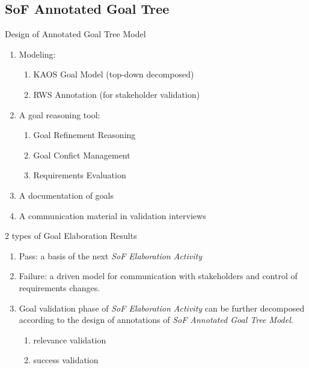 \documentclass{beamer}
\begin{document}
\subsection{SoF Annotated Goal Tree}
\begin{frame}{Design of Annotated Goal Tree Model}
  \begin{enumerate}
  \item Modeling:
    \begin{enumerate}
    \item KAOS Goal Model  (top-down decomposed)
    \item RWS Annotation  (for stakeholder validation)
    \end{enumerate}
  \item A goal reasoning tool: 
    \begin{enumerate}
    \item Goal Refinement Reasoning
    \item Goal Confict Management
    \item Requirements Evaluation
    \end{enumerate}
  \item A documentation of goals
  \item A communication material in validation interviews
  \end{enumerate}
\end{frame}  
\begin{frame}{2 types of Goal Elaboration Results}
  \begin{enumerate}
  \item Pass: a basis of the next \emph{SoF Elaboration Activity} 
  \item Failure: a driven model for communication with stakeholders and control of requirements changes. 
  \item Goal validation phase of \emph{SoF Elaboration Activity} can be further decomposed according to the design of annotations of \emph{SoF Annotated Goal Tree Model}.
    \begin{enumerate}
    \item relevance validation
    \item success validation
    \end{enumerate}
  \end{enumerate}
\end{frame}
\end{document}
